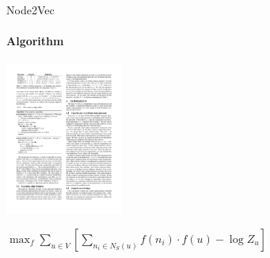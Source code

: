 \documentclass{beamer}
\begin{document}
\begin{frame}{Node2Vec}
    \framesubtitle{Algorithm}
    \centering\includegraphics[height=5cm]{node2vec_3.pdf}
    \begin{corollary}
        $\max _{f} \sum_{u \in V}\left[\sum_{n_{i} \in N_{S}(u)} f\left(n_{i}\right) \cdot f(u)-\log Z_{u}\right]$
    \end{corollary}
\end{frame}
\end{document}

